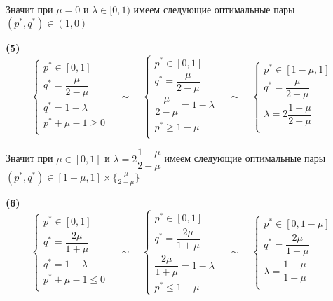 Значит при $\mu=0$ и $\lambda \in [0, 1)$ имеем следующие оптимальные пары
$ (p^*, q^*) \in (1, 0)$

\hspace{5mm}

\textbf{(5)}
$$
	\begin{cases}
		p^* \in [0, 1] \\
		q^* = \dfrac{\mu}{2-\mu} \\
		q^* = 1 - \lambda \\
		p^* + \mu - 1 \geqslant 0 \\
	\end{cases}
	\quad \sim \quad
	\begin{cases}
		p^* \in [0, 1] \\
		q^* = \dfrac{\mu}{2-\mu} \\
		\dfrac{\mu}{2-\mu} = 1 - \lambda \\
		p^* \geqslant 1 - \mu \\
	\end{cases}
	\quad \sim \quad
	\begin{cases}
		p^* \in [1 - \mu, 1] \\
		q^* = \dfrac{\mu}{2-\mu} \\
		\lambda = 2\dfrac{1-\mu}{2-\mu} \\
	\end{cases}
$$

Значит при $\mu \in [0, 1]$ и $\lambda = 2\dfrac{1 - \mu}{2 - \mu}$ 
имеем следующие оптимальные пары
$ (p^*, q^*) \in [1 - \mu, 1] \times  \{ \frac{\mu}{2 - \mu}\}$

\hspace{5mm}

\textbf{(6)}
$$
	\begin{cases}
		p^* \in [0, 1] \\
		q^*= \dfrac{2\mu}{1+\mu} \\
		q^* = 1 - \lambda \\
		p^* + \mu - 1 \leqslant 0 \\
	\end{cases}
	\quad \sim \quad
	\begin{cases}
		p^* \in [0, 1] \\
		q^* = \dfrac{2\mu}{1+\mu} \\
		\dfrac{2\mu}{1+\mu} = 1 - \lambda \\
		p^* \leqslant 1 - \mu 
	\end{cases}
	\quad \sim \quad
	\begin{cases}
		p^* \in [0, 1 - \mu] \\
		q^* = \dfrac{2\mu}{1+\mu} \\
		\lambda = \dfrac{1-\mu}{1+\mu} \\
	\end{cases}
$$

